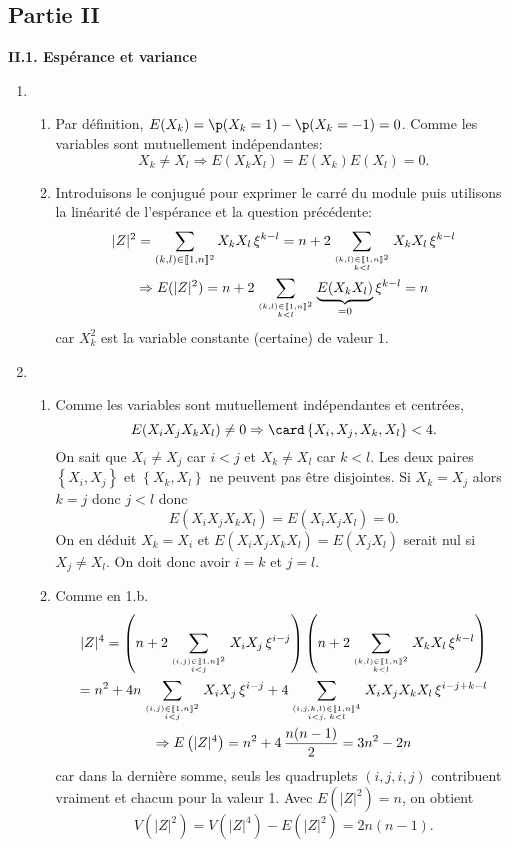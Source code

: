\subsection*{Partie II}
\textbf{II.1. Espérance et variance}
\begin{enumerate}
  \item 
  \begin{enumerate}
    \item   Par définition, $E(X_k) = \p(X_k=1) - \p(X_k = -1) = 0$. Comme les variables sont mutuellement indépendantes:
\[
  X_k \neq X_l \Rightarrow E(X_k X_l) = E(X_k) E(X_l) = 0.
\]
    \item Introduisons le conjugué pour exprimer le carré du module puis utilisons la linéarité de l'espérance et la question précédente: 
\begin{multline*}
  |Z|^2 = \sum_{(k,l)\in \llbracket 1,n \rrbracket^2}X_kX_l\, \xi^{k-l} 
  = n + 2 \sum_{(k,l)\in \llbracket 1,n \rrbracket^2 \atop k < l}X_kX_l\, \xi^{k-l} \\
  \Rightarrow
  E(|Z|^2) = n + 2\sum_{(k,l)\in \llbracket 1,n \rrbracket^2 \atop k < l} \underset{ = 0}{\underbrace{E(X_k X_l)}}\, \xi^{k-l} 
   = n
\end{multline*}
car $X_k^2$ est la variable constante (certaine) de valeur $1$.
  \end{enumerate}

  \item 
  \begin{enumerate}
    \item Comme les variables sont mutuellement indépendantes et centrées,
\[
  E(X_i X_j X_k X_l) \neq 0 \Rightarrow  \card \left\lbrace X_i, X_j, X_k, X_l \right\rbrace < 4 .
\]
On sait que $X_i \neq X_j$ car $i < j$ et $X_k \neq X_l$ car $k < l$. Les deux paires $\left \lbrace X_i, X_j\right\rbrace$ et $\left \lbrace X_k, X_l\right\rbrace$ ne peuvent pas être disjointes.\newline
Si $X_k = X_j$ alors $k = j$ donc $j < l$ donc 
\[
  E(X_i X_j X_k X_l) = E(X_i X_j X_l) = 0.
\]
On en déduit $X_k = X_i$ et $E(X_i X_j X_k X_l) = E(X_j X_l)$ serait nul si $X_j \neq X_l$. On doit donc avoir $i=k$ et $j=l$.

    \item Comme en 1.b.
\begin{multline*}
|Z|^4 = \left( n + 2 \sum_{(i,j)\in \llbracket 1,n \rrbracket^2 \atop i < j}X_i X_j \, \xi^{i-j}\right)
        \left( n + 2 \sum_{(k,l)\in \llbracket 1,n \rrbracket^2 \atop k < l}X_kX_l\, \xi^{k-l}\right)\\
= n^2 + 4n \sum_{(i,j)\in \llbracket 1,n \rrbracket^2 \atop i < j}X_i X_j \, \xi^{i-j} + 
4 \sum_{(i,j,k,l)\in \llbracket 1,n \rrbracket^4 \atop i< j, \; k < l} X_i X_j X_kX_l\, \xi^{i-j+k-l}  \\
\Rightarrow E \left(|Z|^4\right) = n^2 + 4\,  \frac{n(n-1)}{2} = 3n^2 - 2n
\end{multline*}
car dans la dernière somme, seuls les quadruplets $(i,j,i,j)$ contribuent vraiment et chacun pour la valeur 1.\newline
Avec $E(|Z|^2) = n$, on obtient
\[
  V(|Z|^2) = V(|Z|^4) - E(|Z|^2) = 2n(n-1).
\]
  \end{enumerate}
\end{enumerate}
  

